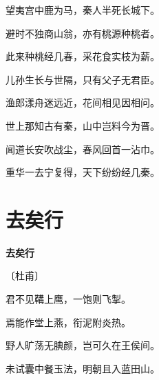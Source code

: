 \documentclass[12pt,UTF-8,openany,fontset=none]{ctexbook}
\begin{document}
\begin{center}
    \begin{Large}

        望夷宫中鹿为马，秦人半死长城下。

        避时不独商山翁，亦有桃源种桃者。

        此来种桃经几春，采花食实枝为薪。

        儿孙生长与世隔，只有父子无君臣。

        渔郎漾舟迷远近，花间相见因相问。

        世上那知古有秦，山中岂料今为晋。

        闻道长安吹战尘，春风回首一沾巾。

        重华一去宁复得，天下纷纷经几秦。

    \end{Large}

\end{center}

\vspace{8pt}
\clearpage

\section{去矣行}


\begin{center}
    {\bfseries 去矣行}

    \vspace{18pt}

    \begin{large}\xuwen
        〔杜甫〕
    \end{large}

\end{center}

    \vspace{18pt}  %

\begin{center}
    \begin{Large}

        君不见鞲上鹰，一饱则飞掣。

        焉能作堂上燕，衔泥附炎热。

        野人旷荡无腆颜，岂可久在王侯间。

        未试囊中餐玉法，明朝且入蓝田山。

    \end{Large}

\end{center}
\end{document}
